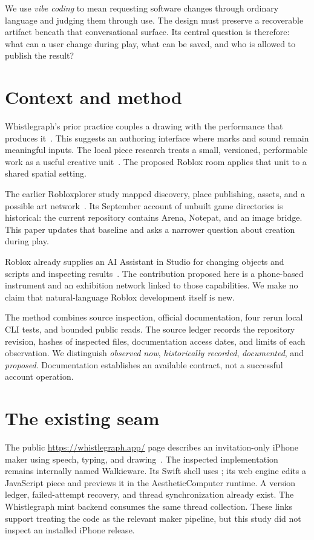 \documentclass[10pt,letterpaper,twocolumn]{article}
\renewcommand{\ac}{Aesthetic\acdot Computer}
\newcommand{\pc}[1]{{\ttfamily\small\path{#1}}}
\begin{document}
We use \emph{vibe coding} to mean requesting software changes through ordinary language and judging them through use. The design must preserve a recoverable artifact beneath that conversational surface. Its central question is therefore: what can a user change during play, what can be saved, and who is allowed to publish the result?

\section{Context and method}
Whistlegraph's prior practice couples a drawing with the performance that produces it~\cite{whistlegraph}. This suggests an authoring interface where marks and sound remain meaningful inputs. The local piece research treats a small, versioned, performable work as a useful creative unit~\cite{pieces}. The proposed Roblox room applies that unit to a shared spatial setting.

The earlier Robloxplorer study mapped discovery, place publishing, assets, and a possible art network~\cite{robloxplorer}. Its September account of unbuilt game directories is historical: the current repository contains Arena, Notepat, and an image bridge. This paper updates that baseline and asks a narrower question about creation during play.

Roblox already supplies an AI Assistant in Studio for changing objects and scripts and inspecting results~\cite{assistant}. The contribution proposed here is a phone-based instrument and an exhibition network linked to those capabilities. We make no claim that natural-language Roblox development itself is new.

The method combines source inspection, official documentation, four rerun local CLI tests, and bounded public reads. The source ledger records the repository revision, hashes of inspected files, documentation access dates, and limits of each observation. We distinguish \emph{observed now}, \emph{historically recorded}, \emph{documented}, and \emph{proposed}. Documentation establishes an available contract, not a successful account operation.

\section{The existing seam}
The public \url{https://whistlegraph.app/} page describes an invitation-only iPhone maker using speech, typing, and drawing~\cite{app}. The inspected implementation remains internally named Walkieware. Its Swift shell uses \pc{WKWebView}; its web engine edits a JavaScript piece and previews it in the \ac{} runtime. A version ledger, failed-attempt recovery, and thread synchronization already exist. The Whistlegraph mint backend consumes the same thread collection. These links support treating the code as the relevant maker pipeline, but this study did not inspect an installed iPhone release.
\end{document}
